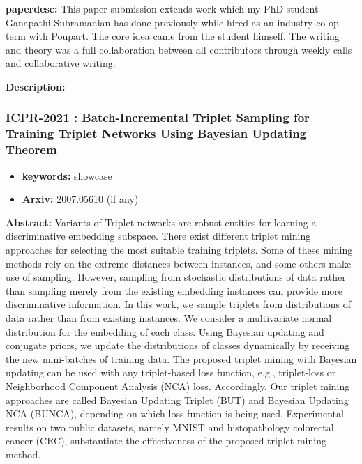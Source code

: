 \documentclass{article}
\begin{document}
\textbf{paperdesc:} This paper submission extends work which my PhD student Ganapathi Subramanian has done previously while hired as an industry co-op term with Poupart. The core idea came from the student himself. The writing and theory was a full collaboration between all contributors through weekly calls and collaborative writing.

\textbf{Description:} 



\newpage
\subsubsection{\textbf{ICPR-2021} : Batch-Incremental Triplet Sampling for Training Triplet Networks Using Bayesian Updating Theorem}
\begin{itemize}
\item \textbf{keywords:} showcase
\item \textbf{Arxiv:} 2007.05610 (if any)
\end{itemize}


\textbf{Abstract:} Variants of Triplet networks are robust entities for learning a discriminative embedding subspace. There exist different triplet mining approaches for selecting the most suitable training triplets. Some of these mining methods rely on the extreme distances between instances, and some others make use of sampling. However, sampling from stochastic distributions of data rather than sampling merely from the existing embedding instances can provide more discriminative information. In this work, we sample triplets from distributions of data rather than from existing instances. We consider a multivariate normal distribution for the embedding of each class. Using Bayesian updating and conjugate priors, we update the distributions of classes dynamically by receiving the new mini-batches of training data. The proposed triplet mining with Bayesian updating can be used with any triplet-based loss function, e.g., triplet-loss or Neighborhood Component Analysis (NCA) loss. Accordingly, Our triplet mining approaches are called Bayesian Updating Triplet (BUT) and Bayesian Updating NCA (BUNCA), depending on which loss function is being used. Experimental results on two public datasets, namely MNIST and histopathology colorectal cancer (CRC), substantiate the effectiveness of the proposed triplet mining method.
\end{document}
